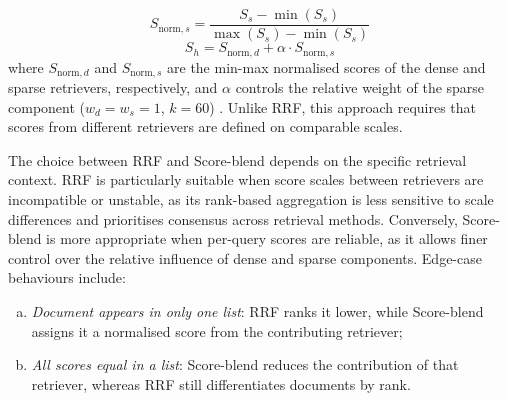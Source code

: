 \begin{spacing}{1.5}
\begin{itemize}
\begin{itemize}
\[S_{\text{norm},s} = \frac{S_s - \min(S_s)}{\max(S_s) - \min(S_s)}
\]
\[
S_h = S_{\text{norm},d} + \alpha \cdot S_{\text{norm},s}
\]
where $S_{\text{norm},d}$ and $S_{\text{norm},s}$ are the min-max normalised scores of the dense and sparse retrievers, respectively, and $\alpha$ controls the relative weight of the sparse component ($w_d = w_s = 1$, $k = 60$) \citep{wang_searching_2024}. Unlike RRF, this approach requires that scores from different retrievers are defined on comparable scales.
\end{itemize}
\end{itemize}
\vspace{1em}

The choice between RRF and Score-blend depends on the specific retrieval context. RRF is particularly suitable when score scales between retrievers are incompatible or unstable, as its rank-based aggregation is less sensitive to scale differences and prioritises consensus across retrieval methods. Conversely, Score-blend is more appropriate when per-query scores are reliable, as it allows finer control over the relative influence of dense and sparse components. Edge-case behaviours include: 
\begin{enumerate}[(a)] 
\item \textit{Document appears in only one list}: RRF ranks it lower, while Score-blend assigns it a normalised score from the contributing retriever;
\item \textit{All scores equal in a list}: Score-blend reduces the contribution of that retriever, whereas RRF still differentiates documents by rank.
\end{enumerate}



\end{spacing}
